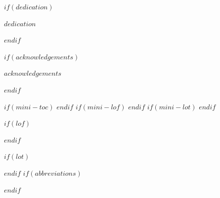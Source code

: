 \documentclass[a4paper, $if(page-layout)$$page-layout$$endif$]{templates/ociamthesis}
\begin{document}
\begin{romanpages}

\maketitle

$if(dedication)$
\begin{dedication}
  $dedication$
\end{dedication}
$endif$

$if(acknowledgements)$
\begin{acknowledgements}
 	$acknowledgements$
\end{acknowledgements}
$endif$


\begin{abstract}
	$abstract$
\end{abstract}

$if(mini-toc)$
  \dominitoc %
$endif$
$if(mini-lof)$
  \dominilof  %
$endif$
$if(mini-lot)$
  \dominilot  %
$endif$

\flushbottom

\tableofcontents

$if(lof)$
\listoffigures
	\mtcaddchapter
$endif$

$if(lot)$
\listoftables
  \mtcaddchapter
$endif$
$if(abbreviations)$

$endif$

\end{romanpages}
\end{document}
